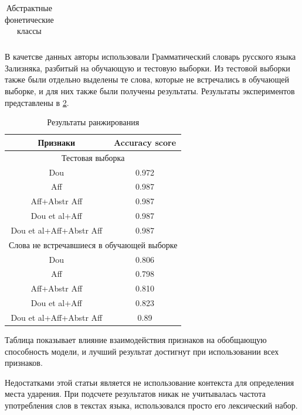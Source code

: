 \documentclass[14pt, a4paper, russian]{report}
\begin{document}
\begin{normalsize}
\begin{table}[H]
\begin{small}
\begin{center}
\begin{tabular}{|c|c|}
			\end{tabular}
		\end{center}
	\end{small}
	\caption{ Абстрактные фонетические классы}
	\label{table:phon_class}
\end{table}

В качетсве данных авторы использовали Грамматический словарь русского языка Зализняка\cite{zaliz}, разбитый на обучающую и тестовую выборки. Из тестовой выборки также были отдельно выделены те слова, которые не встречались в обучающей выборке,  и для них также были получены  результаты. Результаты экспериментов представлены в \cref{table:range_res}.
\begin{table}[H]
	\begin{small}
		\begin{center}
			\begin{tabular}{|c|c|}
				\hline
				Признаки & Accuracy score \\
				\hline
				\multicolumn{2}{|c|}{Тестовая выборка} \\			
				\hline
				Dou &0.972 \\
				\hline
				Aff & 0.987 \\
				\hline
				Aff+Abstr Aff & 0.987 \\
				\hline
				Dou et al+Aff & 0.987 \\
				\hline
				Dou et al+Aff+Abstr Aff & 0.987 \\
				\hline
				\multicolumn{2}{|c|}{Слова не встречавшиеся в обучающей выборке} \\			
				\hline
				Dou &0.806 \\
				\hline
				Aff & 0.798 \\
				\hline
				Aff+Abstr Aff & 0.810 \\
				\hline
				Dou et al+Aff & 0.823 \\
				\hline
				Dou et al+Aff+Abstr Aff & 0.89 \\
				\hline
				
			\end{tabular}
		\end{center}
	\end{small}
	\caption{Результаты ранжирования}
	\label{table:range_res}
\end{table}

Таблица показывает  влияние взаимодействия признаков на обобщающую способность модели, и лучший результат достигнут при использовании всех признаков.

Недостатками этой статьи является не использование контекста для определения места ударения. При подсчете результатов никак не учитывалась частота употребления слов в текстах языка, использовался просто его лексический набор.


\end{normalsize}
\end{document}
